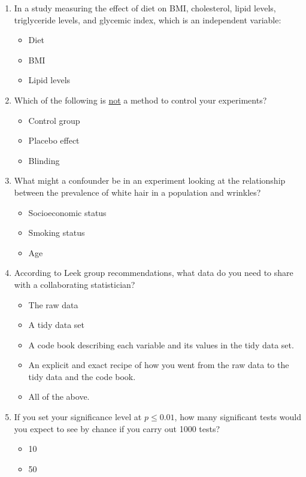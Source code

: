 \documentclass[10pt,a4paper,twoside]{article}\usepackage[]{graphicx}\usepackage[]{xcolor}
\begin{document}
\begin{enumerate}
  \item In a study measuring the effect of diet on BMI, cholesterol, lipid levels, triglyceride levels, and glycemic index, which is an independent variable:
    \begin{itemize}
      \item Diet
      \item BMI
      \item Lipid levels
    \end{itemize}
  \item Which of the following is \underline{not} a method to control your experiments?
    \begin{itemize}
      \item Control group
      \item Placebo effect
      \item Blinding
    \end{itemize}
  \item What might a confounder be in an experiment looking at the relationship between the prevalence of white hair in a population and wrinkles?
    \begin{itemize}
      \item Socioeconomic status
      \item Smoking status
      \item Age
    \end{itemize}
  \item According to Leek group recommendations, what data do you need to share with a collaborating statistician?
    \begin{itemize}
      \item The raw data
      \item A tidy data set
      \item A code book describing each variable and its values in the tidy data set.
      \item An explicit and exact recipe of how you went from the raw data to the tidy data and the code book.
      \item All of the above.
    \end{itemize}
  \item If you set your significance level at $p\leq 0.01$, how many significant tests would you expect to see by chance if you carry out 1000 tests?
    \begin{itemize}
      \item 10
      \item 50

\end{itemize}
\end{enumerate}
\end{document}
